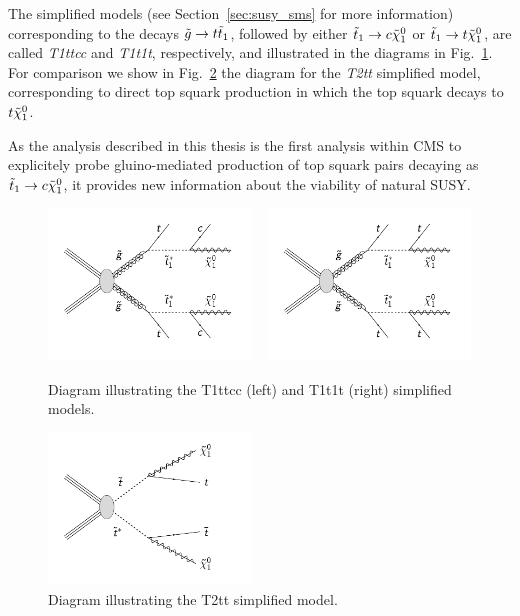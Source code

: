 The simplified models (see Section~\ref{sec:susy_sms} for more information) corresponding to the
decays $\tilde{g} \rightarrow t \tilde{t}_1$, followed by either $\tilde{t}_1 \rightarrow c \tilde{\chi}_1^0$ or
$\tilde{t}_1 \rightarrow t \tilde{\chi}_1^0$, are called \textit{T1ttcc} and \textit{T1t1t}, respectively, and
illustrated in the diagrams in Fig.~\ref{fig:T1ttcc_T1t1t_diagrams}. For comparison we show in
Fig.~\ref{fig:T2tt_diagram} the diagram for the \textit{T2tt} simplified model, corresponding to
direct top squark production in which the top squark decays to $t \tilde{\chi}_1^0$. 

As the analysis described in this thesis is the first analysis within CMS to explicitely probe
gluino-mediated production of top squark pairs decaying as $\tilde{t}_1 \rightarrow c \tilde{\chi}_1^0$, it
provides new information about the viability of natural SUSY. 

\begin{figure}
  \centering
  \includegraphics[width=0.48\textwidth,clip=true,trim=0 0.7cm 0 0]
{figures/razor_interpretation/T1ttcc}
  ~
  \includegraphics[width=0.48\textwidth,clip=true,trim=0 0.7cm 0 0]
{figures/razor_interpretation/T1t1t}
  \caption{Diagram illustrating the T1ttcc (left) and T1t1t (right) simplified models.
  \label{fig:T1ttcc_T1t1t_diagrams}}
\end{figure}

\begin{figure}
  \centering
  \includegraphics[width=0.48\textwidth,clip=true,trim=0 0.7cm 0 0]{figures/razor_motivation/T2tt}
  \caption{Diagram illustrating the T2tt simplified model.
  \label{fig:T2tt_diagram}}
\end{figure}


